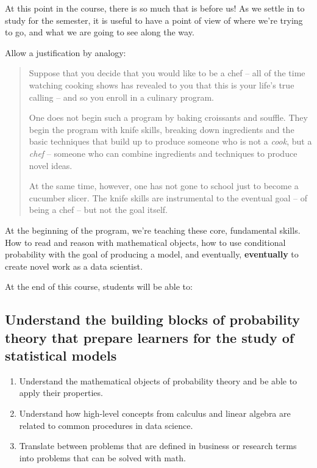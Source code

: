 \documentclass[
]{book}
\providecommand{\tightlist}{%
  \setlength{\itemsep}{0pt}\setlength{\parskip}{0pt}}
\theoremstyle{definition}
\theoremstyle{definition}
\theoremstyle{definition}
\theoremstyle{definition}
\theoremstyle{remark}
\begin{document}
At this point in the course, there is so much that is before us! As we settle in to study for the semester, it is useful to have a point of view of where we're trying to go, and what we are going to see along the way.

Allow a justification by analogy:

\begin{quote}
Suppose that you decide that you would like to be a chef -- all of the time watching cooking shows has revealed to you that this is your life's true calling -- and so you enroll in a culinary program.

One does not begin such a program by baking croissants and souffle. They begin the program with knife skills, breaking down ingredients and the basic techniques that build up to produce someone who is not a \emph{cook}, but a \emph{chef} -- someone who can combine ingredients and techniques to produce novel ideas.

At the same time, however, one has not gone to school just to become a cucumber slicer. The knife skills are instrumental to the eventual goal -- of being a chef -- but not the goal itself.
\end{quote}

At the beginning of the program, we're teaching these core, fundamental skills. How to read and reason with mathematical objects, how to use conditional probability with the goal of producing a model, and eventually, \textbf{eventually} to create novel work as a data scientist.

At the end of this course, students will be able to:

\subsection{Understand the building blocks of probability theory that prepare learners for the study of statistical models}\label{understand-the-building-blocks-of-probability-theory-that-prepare-learners-for-the-study-of-statistical-models}

\begin{enumerate}
\def\labelenumi{\arabic{enumi}.}
\tightlist
\item
  Understand the mathematical objects of probability theory and be able to apply their properties.
\item
  Understand how high-level concepts from calculus and linear algebra are related to common procedures in data science.
\item
  Translate between problems that are defined in business or research terms into problems that can be solved with math.
\end{enumerate}
\end{document}
